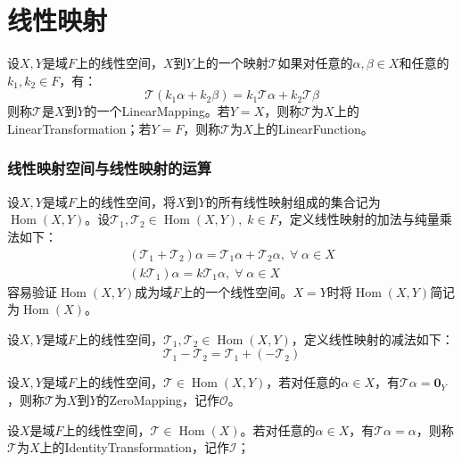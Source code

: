 \section{线性映射}

\begin{definition}
	设$X,Y$是域$F$上的线性空间，$X$到$Y$上的一个映射$\mathcal{T}$如果对任意的$\alpha,\beta\in X$和任意的$k_1,k_2\in F$，有：
	\begin{equation*}
		\mathcal{T}(k_1\alpha+k_2\beta)=k_1\mathcal{T}\alpha+k_2\mathcal{T}\beta
	\end{equation*}
	则称$\mathcal{T}$是$X$到$Y$的一个\gls{LinearMapping}。若$Y=X$，则称$\mathcal{T}$为$X$上的\gls{LinearTransformation}；若$Y=F$，则称$\mathcal{T}$为$X$上的\gls{LinearFunction}。
\end{definition}
\subsubsection{线性映射空间与线性映射的运算}
\begin{definition}
	设$X,Y$是域$F$上的线性空间，将$X$到$Y$的所有线性映射组成的集合记为$\operatorname{Hom}(X,Y)$。设$\mathcal{T}_1,\mathcal{T}_2\in\operatorname{Hom}(X,Y),\;k\in F$，定义线性映射的加法与纯量乘法如下：
	\begin{gather*}
		(\mathcal{T}_1+\mathcal{T}_2)\alpha=\mathcal{T}_1\alpha+\mathcal{T}_2\alpha,\;\forall\;\alpha\in X \\
		(k\mathcal{T}_1)\alpha=k\mathcal{T}_1\alpha,\;\forall\;\alpha\in X
	\end{gather*}
	容易验证$\operatorname{Hom}(X,Y)$成为域$F$上的一个线性空间。$X=Y$时将$\operatorname{Hom}(X,Y)$简记为$\operatorname{Hom}(X)$。
\end{definition}
\begin{definition}
	设$X,Y$是域$F$上的线性空间，$\mathcal{T}_1,\mathcal{T}_2\in\operatorname{Hom}(X,Y)$，定义线性映射的减法如下：
	\begin{equation*}
		\mathcal{T}_1-\mathcal{T}_2=\mathcal{T}_1+(-\mathcal{T}_2)
	\end{equation*}
\end{definition}
\begin{definition}
	设$X,Y$是域$F$上的线性空间，$\mathcal{T}\in\operatorname{Hom}(X,Y)$，若对任意的$\alpha\in X$，有$\mathcal{T}\alpha=\mathbf{0}_Y$，则称$\mathcal{T}$为$X$到$Y$的\gls{ZeroMapping}，记作$\mathcal{O}$。
\end{definition}
\begin{definition}
	设$X$是域$F$上的线性空间，$\mathcal{T}\in\operatorname{Hom}(X)$。若对任意的$\alpha\in X$，有$\mathcal{T}\alpha=\alpha$，则称$\mathcal{T}$为$X$上的\gls{IdentityTransformation}，记作$\mathcal{I}$；
\end{definition}
